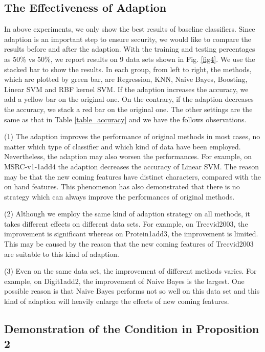 \documentclass[10pt,journal,compsoc]{IEEEtran}
\begin{document}
\subsection{The Effectiveness of Adaption}

In above experiments, we only show the best results of baseline classifiers. Since adaption is an important step to ensure security, we would like to compare the results before and after the adaption. With the training and testing percentages as 50\% vs 50\%, we report results on 9 data sets shown in Fig. \ref{fig4}. We use the stacked bar to show the results. In each group, from left to right, the methods, which are plotted by green bar, are Regression, KNN, Naive Bayes, Boosting, Linear SVM and RBF kernel SVM. If the adaption increases the accuracy, we add a yellow bar on the original one. On the contrary, if the adaption decreases the accuracy, we stack a red bar on the original one. The other settings are the same as that in Table \ref{table_accuracy} and we have the follows observations.

(1) The adaption improves the performance of original methods in most cases, no matter which type of classifier and which kind of data have been employed. Nevertheless, the adaption may also worsen the performances. For example, on MSRC-v1-1add4 the adaption decreases the accuracy of Linear SVM. The reason may be that the new coming features have distinct characters, compared with the on hand features. This phenomenon has also demonstrated that there is no strategy which can always improve the performances of original methods.

(2) Although we employ the same kind of adaption strategy on all methods, it takes different effects on different data sets. For example, on Trecvid2003, the improvement is significant whereas on Protein1add3, the improvement is limited. This may be caused by the reason that the new coming features of Trecvid2003 are suitable to this kind of adaption.

(3) Even on the same data set, the improvement of different methods varies. For example, on Digit1add2, the improvement of Naive Bayes is the largest. One possible reason is that Naive Bayes performs not so well on this data set and this kind of adaption will heavily enlarge the effects of new coming features.

\subsection{Demonstration of the Condition in Proposition 2}
\end{document}
